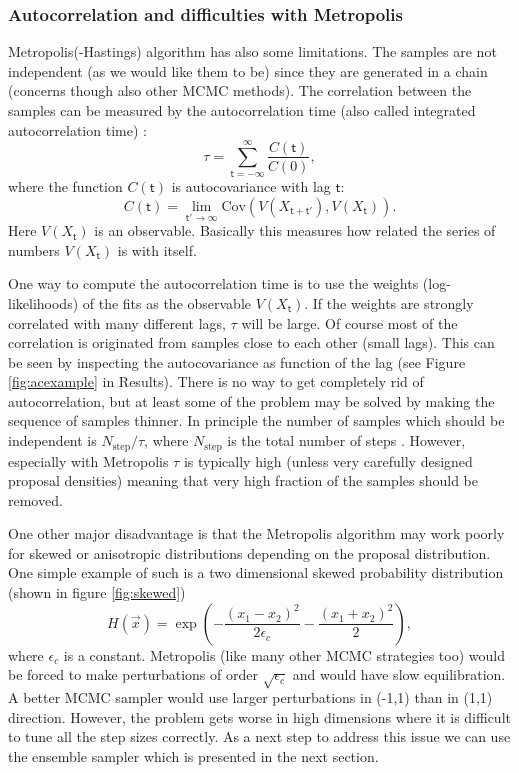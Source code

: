 \documentclass{wihuri}
\def\be{\begin{equation}}
\def\ee{\end{equation}}
\def\tstep{\mathsf{t}}
\begin{document}
\subsubsection{Autocorrelation and difficulties with Metropolis}

Metropolis(-Hastings) algorithm has also some limitations. The samples are not independent (as we would like them to be) since they are generated in a chain (concerns though also other MCMC methods). The correlation between the samples can be measured by the autocorrelation time (also called integrated autocorrelation time) \cite{ensemble1}: 
\be \label{eq:autocorr_time}
\tau = \sum_{\tstep=-\infty}^{\infty} \frac{C(\tstep)}{C(0)} ,
\ee
where the function $C(\tstep)$ is autocovariance with lag $\tstep$:
\be \label{eq:autocovariance}
C(\tstep) = \lim_{\tstep'\to\infty}\mathrm{Cov}(V(X_{\tstep+\tstep'}),V(X_{\tstep})).
\ee
Here $V(X_{\tstep})$ is an observable. Basically this measures how related the series of numbers $V(X_{\tstep})$ is with itself. 

One way to compute the autocorrelation time is to use the weights (log-likelihoods) of the fits as the observable $V(X_{\tstep})$. If the weights are strongly correlated with many different lags, $\tau$ will be large. Of course most of the correlation is originated from samples close to each other (small lags). This can be seen by inspecting the autocovariance as function of the lag (see Figure \ref{fig:acexample} in Results). There is no way to get completely rid of autocorrelation, but at least some of the problem may be solved by making the sequence of samples thinner. In principle the number of samples which should be independent is $N_{\mathrm{step}}/\tau$, where $N_{\mathrm{step}}$ is the total number of steps \cite{kaiser}. However, especially with Metropolis $\tau$ is typically high (unless very carefully designed proposal densities) meaning that very high fraction of the samples should be removed.

One other major disadvantage is that the Metropolis algorithm may work poorly for skewed or anisotropic distributions depending on the proposal distribution. One simple example of such is a two dimensional skewed probability distribution (shown in figure \ref{fig:skewed})
\be \label{eq:skew} 
H(\vec{x}) = \exp(-\frac{(x_{1}-x_{2})^{2}}{2\epsilon_{c}}-\frac{(x_{1}+x_{2})^{2}}{2}),
\ee
where $\epsilon_{c}$  is a constant. Metropolis (like many other MCMC strategies too) would be forced to make perturbations of order $\sqrt{\epsilon_{c}}$ and would have slow equilibration. A better MCMC sampler would use larger perturbations in (-1,1) than in (1,1) direction. However, the problem gets worse in high dimensions where it is difficult to tune all the step sizes correctly. As a next step to address this issue we can use the ensemble sampler which is presented in the next section. 
\end{document}
